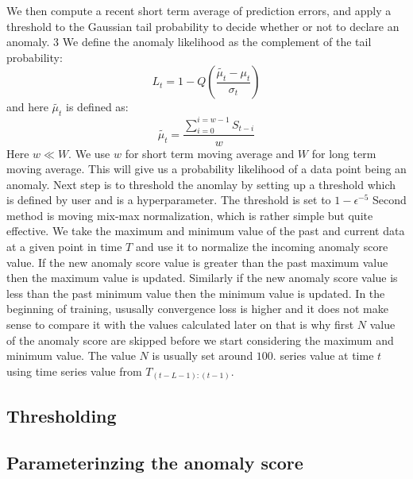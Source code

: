 \documentclass[12pt]{article}
\begin{document}
We then compute a recent short term average of prediction
errors, and apply a threshold to the Gaussian tail probability
to decide whether or not to declare an anomaly. 3
We define the anomaly likelihood as the complement of the tail
probability:
\begin{equation}
L_t = 1-Q (\frac{\tilde{\mu_t}-\mu_t}{\sigma_t})
\end{equation}
and here $\tilde{\mu_t}$ is defined as:
\begin{equation}
\tilde{\mu_t} = \frac{\sum_{i=0}^{i=w-1}S_{t-i}}{w}
\end{equation}
Here $w \ll W$. We use $w$ for short term moving average and $W$ for long term moving average. This will give us a probability likelihood of a data point being an anomaly. Next step is to threshold the anomlay by setting up a threshold which is defined by user and is a hyperparameter. The threshold is set to $1-\epsilon^{-5	}$
Second method is moving mix-max normalization, which is rather simple but quite effective. We take the maximum and minimum value of the past and current data at a given point in time $T$ and use it to normalize the incoming anomaly score value. If the new anomaly score value is greater than the past maximum value then the maximum value is updated. Similarly if the new anomaly score value is less than the past minimum value then the minimum value is updated. In the beginning of training, ususally convergence loss is higher and it does not make sense to compare it with the values calculated later on that is why first $N$ value of the anomaly score are skipped before we start considering the maximum and minimum value. The value $N$ is usually set around $100$.
\break
 series value at time $t$ using time series value from $T_{(t-L-1):(t-1)}$.

\subsection{Thresholding}

\subsection{Parameterinzing the anomaly score}
\end{document}
